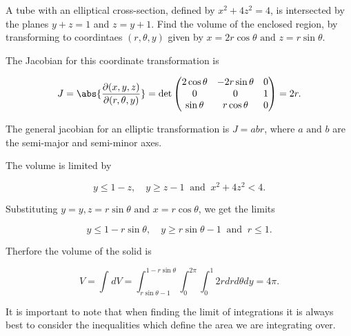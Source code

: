\documentclass[english,a4paper,12pt]{report}
\begin{document}
{A tube with an elliptical cross-section, defined by \(x^2 + 4z^2 = 4\), is intersected by the planes \(y+z=1\) and \(z = y+1\). Find the volume of the enclosed region, by transforming to coordintaes \((r, \theta , y)\) given by \(x = 2r \cos \theta \text { and } z = r\sin \theta \).     }
{The Jacobian for this coordinate transformation is 

\begin{equation}
	J = \abs{\frac{\partial (x,y,z)}{\partial (r,\theta ,y)} } = \det \begin{pmatrix}
		2\cos \theta  & -2r \sin \theta  & 0  \\
		0 & 0 & 1  \\
		\sin \theta  & r \cos \theta  & 0  \\
	\end{pmatrix}= 2r.
\end{equation}

The general jacobian for an elliptic transformation is \(J = abr\), where \(a \text { and } b\) are the semi-major and semi-minor axes.

The volume is limited by 

\begin{equation}
	y \le 1-z, \quad y \ge z-1 ~\text { and }~ x^2+4z^2<4.
\end{equation}

Substituting \(y = y, z = r \sin \theta \text { and } x = r \cos \theta \), we get the limits

\begin{equation}
	y \le 1-r \sin \theta , \quad y \ge r \sin \theta -1 ~\text { and }~ r \le 1.
\end{equation}

Therfore the volume of the solid is 

\begin{equation}
	V = \int_{}^{} dV = \int_{r \sin \theta -1}^{1-r\sin \theta } \int_{0}^{2\pi } \int_{0}^{1} 2r dr d \theta dy = 4\pi .     
\end{equation}

It is important to note that when finding the limit of integrations it is always best to consider the inequalities which define the area we are integrating over.
} 
\end{document}
